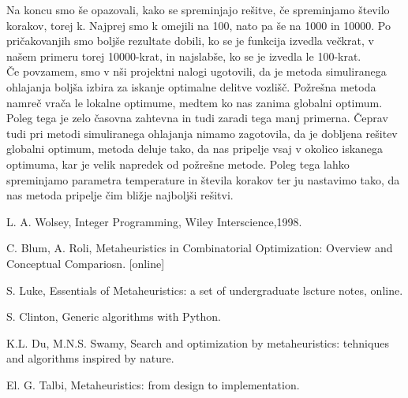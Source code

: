 \documentclass[12pt,a4paper]{amsart}
\theoremstyle{definition} %
\theoremstyle{plain} %
\begin{document}
Na koncu smo še opazovali, kako se spreminjajo rešitve, če spreminjamo število korakov, torej k. Najprej smo k omejili na 100, nato pa še na 1000 in 10000. Po pričakovanjih smo boljše rezultate dobili, ko se je funkcija izvedla večkrat, v našem primeru torej 10000-krat, in najslabše, ko se je izvedla le 100-krat.\\
Če povzamem, smo v nši projektni nalogi ugotovili, da je metoda simuliranega ohlajanja boljša izbira za iskanje optimalne delitve vozlišč. Požrešna metoda namreč vrača le lokalne optimume, medtem ko nas zanima globalni optimum. Poleg tega je zelo časovna zahtevna in tudi zaradi tega manj primerna. Čeprav tudi pri metodi simuliranega ohlajanja nimamo zagotovila, da je dobljena rešitev globalni optimum, metoda deluje tako, da nas pripelje vsaj v okolico iskanega optimuma, kar je velik napredek od požrešne metode. Poleg tega lahko spreminjamo parametra temperature in števila korakov ter ju nastavimo tako, da nas metoda pripelje čim bližje najboljši rešitvi.

\newpage

\begin{thebibliography}{9}
L. A. Wolsey, Integer Programming, Wiley Interscience,1998. 

 
C. Blum, A. Roli, Metaheuristics in Combinatorial Optimization: Overview and Conceptual Compariosn. [online]
 
S. Luke, Essentials of Metaheuristics: a set of undergraduate lscture notes, online. 

S. Clinton, Generic algorithms with Python.

K.L. Du, M.N.S. Swamy, Search and optimization by metaheuristics: tehniques and algorithms inspired by nature. 


El. G. Talbi, Metaheuristics: from design to implementation.

\end{thebibliography}
\end{document}
